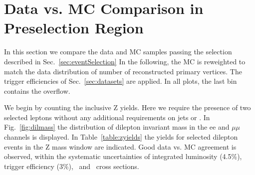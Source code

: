 \clearpage

\section{Data vs. MC Comparison in Preselection Region}
\label{sec:yields}

In this section we compare the data and MC samples passing the selection described in Sec.~\ref{sec:eventSelection}
In the following, the MC is reweighted to match the data distribution of number of reconstructed primary vertices.
The trigger efficiencies of Sec.~\ref{sec:datasets} are applied. In all plots, the last bin contains the overflow.

We begin by counting the inclusive Z yields. Here we require the presence of two selected leptons without
any additional requirements on jets or \MET. In Fig.~\ref{fig:dilmass} the distribution of dilepton invariant
mass in the ee and $\mu\mu$ channels is displayed. In Table~\ref{table:zyields} the yields for selected dilepton
events in the Z mass window are indicated. Good data vs. MC agreement is observed, within the systematic uncertainties
of integrated luminosity (4.5\%), trigger efficiency (3\%), \zjets\ and \ttbar\ cross sections.

